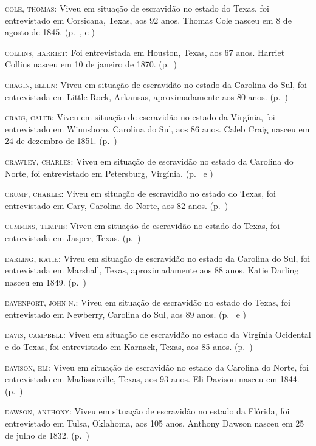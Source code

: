 \begin{Parskip}
\textsc{cole, thomas:} Viveu em situação de escravidão no estado do Texas, foi entrevistado em
Corsicana, Texas, aos 92 anos. Thomas Cole nasceu em 8 de agosto de
1845. (p.~\pageref{ref55}, \pageref{ref56} e \pageref{ref57})

\textsc{collins, harriet:} Foi entrevistada em Houston, Texas, aos 67
anos. Harriet Collins nasceu em 10 de janeiro de 1870. (p.~\pageref{ref58})

\textsc{cragin, ellen:} Viveu em situação de escravidão no estado da Carolina do Sul, foi
entrevistada em Little Rock, Arkansas, aproximadamente aos 80 anos. (p.~\pageref{ref59})

\textsc{craig, caleb:} Viveu em situação de escravidão no estado da Virgínia, foi entrevistado
em Winnsboro, Carolina do Sul, aos 86 anos. Caleb Craig nasceu em 24 de
dezembro de 1851. (p.~\pageref{ref60})

\textsc{crawley, charles:} Viveu em situação de escravidão no estado da Carolina do Norte, foi
entrevistado em Petersburg, Virgínia. (p.~\pageref{ref61} e \pageref{ref62})

\textsc{crump, charlie:} Viveu em situação de escravidão no estado do Texas, foi entrevistado em
Cary, Carolina do Norte, aos 82 anos. (p.~\pageref{ref63})

\textsc{cummins, tempie:} Viveu em situação de escravidão no estado do Texas, foi entrevistada
em Jasper, Texas. (p.~\pageref{ref64})

\textsc{darling, katie:} Viveu em situação de escravidão no estado da Carolina do Sul, foi
entrevistada em Marshall, Texas, aproximadamente aos 88 anos. Katie
Darling nasceu em 1849. (p.~\pageref{ref65})

\textsc{davenport, john n.:} Viveu em situação de escravidão no estado do Texas, foi
entrevistado em Newberry, Carolina do Sul, aos 89 anos. (p.~\pageref{ref66} e \pageref{ref67})

\textsc{davis, campbell:} Viveu em situação de escravidão no estado da Virgínia Ocidental e do
Texas, foi entrevistado em Karnack, Texas, aos 85 anos. (p.~\pageref{ref68})

\textsc{davison, eli:} Viveu em situação de escravidão no estado da Carolina do Norte, foi
entrevistado em Madisonville, Texas, aos 93 anos. Eli Davison nasceu em
1844. (p.~\pageref{ref69})

\textsc{dawson, anthony:} Viveu em situação de escravidão no estado da Flórida, foi entrevistado
em Tulsa, Oklahoma, aos 105 anos. Anthony Dawson nasceu em 25 de julho
de 1832. (p.~\pageref{ref70})


\end{Parskip}

